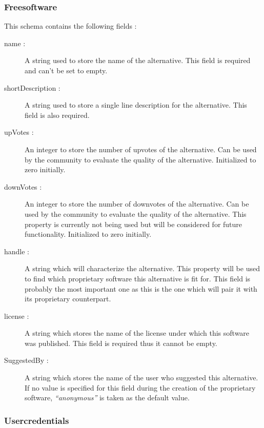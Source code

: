 \medskip

\subsubsection{Freesoftware}
This schema contains the following fields :

\begin{description}

\item[name : ]
A string used to store the name of the alternative. This field is required and can’t be set to empty.

\item[shortDescription : ] 
A string used to store a single line description for the alternative. This field is also required. 

\item[upVotes : ]
An integer to store the number of upvotes of the alternative. Can be used by the community to evaluate the quality of the alternative. Initialized to zero initially.

\item[downVotes : ]
An integer to store the number of downvotes of the alternative. Can be used by the community to evaluate the quality of the alternative. This property is currently not being used but will be considered for future functionality. Initialized to zero initially.

\item[handle : ]
A string which will characterize the alternative. This property will be used to find which proprietary software this alternative is fit for. This field is probably the most important one as this is the one which will pair it with its proprietary counterpart.

\item[license : ]
 A string which stores the name of the license under which this software was published. This field is required thus it cannot be empty.
 
\item[SuggestedBy : ]
 A string which stores the name of the user who suggested this alternative. If no value is specified for this field during the creation of the proprietary software, \textsl{“anonymous”} is taken as the default value.

\end{description}

\medskip

\subsubsection{Usercredentials}

